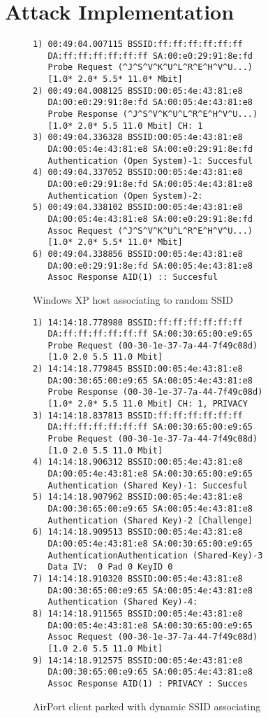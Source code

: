\documentclass[10pt,twocolumn]{article}
\begin{document}
\section{Attack Implementation}
\label{driver}

\begin{figure}[t]
  \begin{verbatim}
1) 00:49:04.007115 BSSID:ff:ff:ff:ff:ff:ff
   DA:ff:ff:ff:ff:ff:ff SA:00:e0:29:91:8e:fd
   Probe Request (^J^S^V^K^U^L^R^E^H^V^U...)
   [1.0* 2.0* 5.5* 11.0* Mbit]
2) 00:49:04.008125 BSSID:00:05:4e:43:81:e8
   DA:00:e0:29:91:8e:fd SA:00:05:4e:43:81:e8
   Probe Response (^J^S^V^K^U^L^R^E^H^V^U...)
   [1.0* 2.0* 5.5 11.0 Mbit] CH: 1
3) 00:49:04.336328 BSSID:00:05:4e:43:81:e8
   DA:00:05:4e:43:81:e8 SA:00:e0:29:91:8e:fd
   Authentication (Open System)-1: Succesful
4) 00:49:04.337052 BSSID:00:05:4e:43:81:e8
   DA:00:e0:29:91:8e:fd SA:00:05:4e:43:81:e8
   Authentication (Open System)-2: 
5) 00:49:04.338102 BSSID:00:05:4e:43:81:e8
   DA:00:05:4e:43:81:e8 SA:00:e0:29:91:8e:fd
   Assoc Request (^J^S^V^K^U^L^R^E^H^V^U...)
   [1.0* 2.0* 5.5* 11.0* Mbit]
6) 00:49:04.338856 BSSID:00:05:4e:43:81:e8
   DA:00:e0:29:91:8e:fd SA:00:05:4e:43:81:e8
   Assoc Response AID(1) :: Succesful
  \end{verbatim}    
  \caption{Windows XP host associating to random SSID}
  \label{winxprandom}
\end{figure}

\begin{figure}[t]
\begin{verbatim}
1) 14:14:18.778980 BSSID:ff:ff:ff:ff:ff:ff
   DA:ff:ff:ff:ff:ff:ff SA:00:30:65:00:e9:65
   Probe Request (00-30-1e-37-7a-44-7f49c08d)
   [1.0 2.0 5.5 11.0 Mbit]
2) 14:14:18.779845 BSSID:00:05:4e:43:81:e8
   DA:00:30:65:00:e9:65 SA:00:05:4e:43:81:e8
   Probe Response (00-30-1e-37-7a-44-7f49c08d)
   [1.0* 2.0* 5.5 11.0 Mbit] CH: 1, PRIVACY
3) 14:14:18.837813 BSSID:ff:ff:ff:ff:ff:ff
   DA:ff:ff:ff:ff:ff:ff SA:00:30:65:00:e9:65
   Probe Request (00-30-1e-37-7a-44-7f49c08d)
   [1.0 2.0 5.5 11.0 Mbit]
4) 14:14:18.906312 BSSID:00:05:4e:43:81:e8
   DA:00:05:4e:43:81:e8 SA:00:30:65:00:e9:65
   Authentication (Shared Key)-1: Succesful
5) 14:14:18.907962 BSSID:00:05:4e:43:81:e8
   DA:00:30:65:00:e9:65 SA:00:05:4e:43:81:e8
   Authentication (Shared Key)-2 [Challenge] 
6) 14:14:18.909513 BSSID:00:05:4e:43:81:e8
   DA:00:05:4e:43:81:e8 SA:00:30:65:00:e9:65
   AuthenticationAuthentication (Shared-Key)-3
   Data IV:  0 Pad 0 KeyID 0
7) 14:14:18.910320 BSSID:00:05:4e:43:81:e8
   DA:00:30:65:00:e9:65 SA:00:05:4e:43:81:e8
   Authentication (Shared Key)-4: 
8) 14:14:18.911565 BSSID:00:05:4e:43:81:e8
   DA:00:05:4e:43:81:e8 SA:00:30:65:00:e9:65
   Assoc Request (00-30-1e-37-7a-44-7f49c08d)
   [1.0 2.0 5.5 11.0 Mbit]
9) 14:14:18.912575 BSSID:00:05:4e:43:81:e8
   DA:00:30:65:00:e9:65 SA:00:05:4e:43:81:e8
   Assoc Response AID(1) : PRIVACY : Succes
\end{verbatim}
\caption{AirPort client parked with dynamic SSID associating}
\label{osxapdynamic}
\end{figure}
\end{document}
